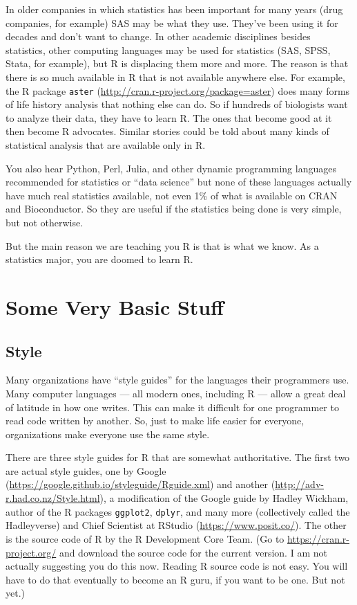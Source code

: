 \documentclass[
]{article}
\begin{document}
In older companies in which statistics has been important for many years
(drug companies, for example) SAS may be what they use. They've been
using it for decades and don't want to change. In other academic
disciplines besides statistics, other computing languages may be used
for statistics (SAS, SPSS, Stata, for example), but R is displacing them
more and more. The reason is that there is so much available in R that
is not available anywhere else. For example, the R package
\texttt{aster} (\url{http://cran.r-project.org/package=aster}) does many
forms of life history analysis that nothing else can do. So if hundreds
of biologists want to analyze their data, they have to learn R. The ones
that become good at it then become R advocates. Similar stories could be
told about many kinds of statistical analysis that are available only in
R.

You also hear Python, Perl, Julia, and other dynamic programming
languages recommended for statistics or ``data science'' but none of
these languages actually have much real statistics available, not even
1\% of what is available on CRAN and Bioconductor. So they are useful if
the statistics being done is very simple, but not otherwise.

But the main reason we are teaching you R is that is what we know. As a
statistics major, you are doomed to learn R.

\hypertarget{some-very-basic-stuff}{%
\section{Some Very Basic Stuff}\label{some-very-basic-stuff}}

\hypertarget{style}{%
\subsection{Style}\label{style}}

Many organizations have ``style guides'' for the languages their
programmers use. Many computer languages --- all modern ones, including
R --- allow a great deal of latitude in how one writes. This can make it
difficult for one programmer to read code written by another. So, just
to make life easier for everyone, organizations make everyone use the
same style.

There are three style guides for R that are somewhat authoritative. The
first two are actual style guides, one by Google
(\url{https://google.github.io/styleguide/Rguide.xml}) and another
(\url{http://adv-r.had.co.nz/Style.html}), a modification of the Google
guide by Hadley Wickham, author of the R packages \texttt{ggplot2},
\texttt{dplyr}, and many more (collectively called the Hadleyverse) and
Chief Scientist at RStudio (\url{https://www.posit.co/}). The other is
the source code of R by the R Development Core Team. (Go to
\url{https://cran.r-project.org/} and download the source code for the
current version. I am not actually suggesting you do this now. Reading R
source code is not easy. You will have to do that eventually to become
an R guru, if you want to be one. But not yet.)
\end{document}
